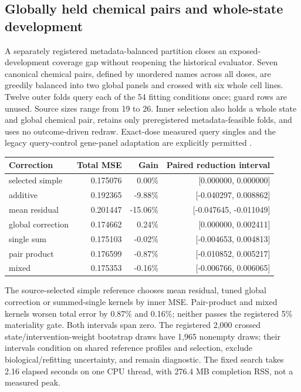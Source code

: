 \subsection{Globally held chemical pairs and whole-state development}
A separately registered metadata-balanced partition closes an exposed-development coverage gap without reopening the historical evaluator. Seven canonical chemical pairs, defined by unordered names across all doses, are greedily balanced into two global panels and crossed with six whole cell lines. Twelve outer folds query each of the 54 fitting conditions once; guard rows are unused. Source sizes range from 19 to 26. Inner selection also holds a whole state and global chemical pair, retains only preregistered metadata-feasible folds, and uses no outcome-driven redraw. Exact-dose measured query singles and the legacy query-control gene-panel adaptation are explicitly permitted \citep{opaljoint2026}.
\begin{center}\small\begin{tabular}{lrrr}\toprule
Correction & Total MSE & Gain & Paired reduction interval\\\midrule
selected simple & 0.175076 & 0.00\% & [0.000000, 0.000000]\\
additive & 0.192365 & -9.88\% & [-0.040297, 0.008862]\\
mean residual & 0.201447 & -15.06\% & [-0.047645, -0.011049]\\
global correction & 0.174662 & 0.24\% & [0.000000, 0.002411]\\
single sum & 0.175103 & -0.02\% & [-0.004653, 0.004813]\\
pair product & 0.176599 & -0.87\% & [-0.010852, 0.005217]\\
mixed & 0.175353 & -0.16\% & [-0.006766, 0.006065]\\
\bottomrule\end{tabular}\end{center}
The source-selected simple reference chooses mean residual, tuned global correction or summed-single kernels by inner MSE. Pair-product and mixed kernels worsen total error by 0.87\% and 0.16\%; neither passes the registered 5\% materiality gate. Both intervals span zero. The registered 2,000 crossed state/intervention-weight bootstrap draws have 1,965 nonempty draws; their intervals condition on shared reference profiles and selection, exclude biological/refitting uncertainty, and remain diagnostic. The fixed search takes 2.16 elapsed seconds on one CPU thread, with 276.4 MB completion RSS, not a measured peak.
